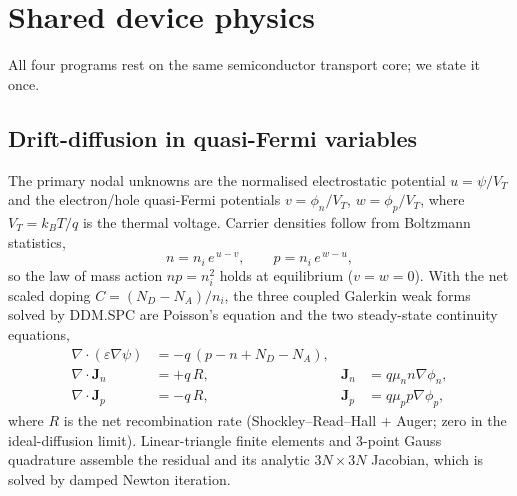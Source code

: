 \documentclass[11pt,a4paper]{article}
\begin{document}
\section{Shared device physics}
\label{sec:device}

All four programs rest on the same semiconductor transport core; we state it once.

\subsection{Drift-diffusion in quasi-Fermi variables}
The primary nodal unknowns are the normalised electrostatic potential
$u=\psi/V_T$ and the electron/hole quasi-Fermi potentials $v=\phi_n/V_T$,
$w=\phi_p/V_T$, where $V_T=k_BT/q$ is the thermal voltage. Carrier densities
follow from Boltzmann statistics,
\begin{equation}
  n = n_i\,e^{\,u-v}, \qquad p = n_i\,e^{\,w-u},
  \label{eq:boltzmann}
\end{equation}
so the law of mass action $np=n_i^2$ holds at equilibrium ($v=w=0$). With the
net scaled doping $C=(N_D-N_A)/n_i$, the three coupled Galerkin weak forms solved
by DDM.SPC are Poisson's equation and the two steady-state continuity equations,
\begin{align}
  \nabla\!\cdot\!(\varepsilon\nabla\psi) &= -q\,(p-n+N_D-N_A), \label{eq:poisson}\\
  \nabla\!\cdot\mathbf{J}_n &= +q\,R, &
  \mathbf{J}_n &= q\mu_n n\nabla\phi_n, \label{eq:jn}\\
  \nabla\!\cdot\mathbf{J}_p &= -q\,R, &
  \mathbf{J}_p &= q\mu_p p\nabla\phi_p, \label{eq:jp}
\end{align}
where $R$ is the net recombination rate (Shockley--Read--Hall + Auger; zero in
the ideal-diffusion limit). Linear-triangle finite elements and 3-point Gauss
quadrature assemble the residual and its analytic $3N\times 3N$ Jacobian, which
is solved by damped Newton iteration.
\end{document}
